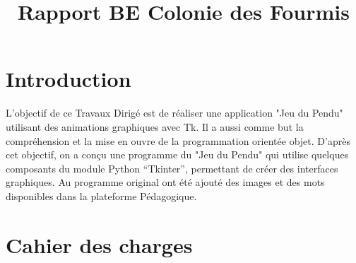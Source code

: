 \documentclass{rapportECL}
\title{Rapport BE Colonie des Fourmis} %
\begin{document}




        
\fairemarges %
\fairepagedegarde %
\tabledematieres %



\section{Introduction} 

 L'objectif de ce Travaux Dirigé est de réaliser une application "Jeu du Pendu" utilisant des animations graphiques avec Tk. Il a aussi comme but la compréhension et la mise en ouvre de la programmation orientée objet. D'après cet objectif, on a conçu une programme du "Jeu du Pendu" qui utilise quelques composants du  module  Python “Tkinter”, permettant de créer des interfaces graphiques. Au programme original ont été ajouté des images et des mots disponibles dans la plateforme Pédagogique. 


\section{Cahier des charges}


\end{document}
